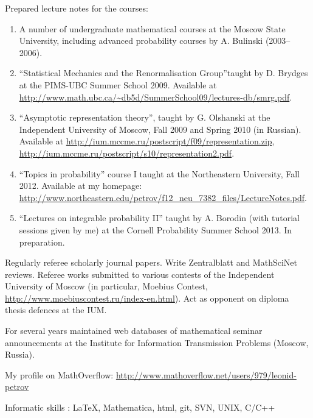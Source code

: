 \documentclass[letterpaper,11pt]{article}
\begin{document}
Prepared lecture notes for the courses:
\begin{enumerate}
  \item A number of 
  undergraduate mathematical courses 
  at the Moscow State University, 
  including advanced probability courses
  by A. Bulinski (2003--2006).

  \item ``Statistical Mechanics and the Renormalisation Group''taught by D. Brydges
  at the PIMS-UBC Summer School 2009.
  Available at \\
  \url{http://www.math.ubc.ca/~db5d/SummerSchool09/lectures-db/smrg.pdf}.

  \item ``Asymptotic representation theory'',
  taught by G. Olshanski 
  at the Independent University of Moscow,
  Fall 2009 and Spring 2010 (in Russian). 
  Available at 
  \url{http://ium.mccme.ru/postscript/f09/representation.zip},
  \url{http://ium.mccme.ru/postscript/s10/representation2.pdf}.

  \item ``Topics in probability''
  course I taught
  at the Northeastern University, 
  Fall 2012. Available at
  my homepage:
  \url{http://www.northeastern.edu/petrov/f12_neu_7382_files/LectureNotes.pdf}.

  \item ``Lectures on
  integrable probability II''
  taught by A. Borodin (with tutorial sessions 
  given by me)
  at the Cornell Probability Summer School 2013. 
  In preparation.
\end{enumerate}

\smallskip


Regularly referee scholarly journal papers. Write Zentralblatt and MathSciNet reviews. Referee works submitted to various contests of the Independent University of Moscow (in particular, Moebius Contest, \url{http://www.moebiuscontest.ru/index-en.html}). Act as opponent on diploma thesis defences at the IUM.

\smallskip

For several years maintained web databases of mathematical seminar announcements at the Institute for Information Transmission Problems (Moscow, Russia).

\smallskip

My profile on MathOverflow: \url{http://www.mathoverflow.net/users/979/leonid-petrov}

\smallskip

Informatic skills : \LaTeX, Mathematica, html, git, SVN, UNIX, C/C++
\end{document}

